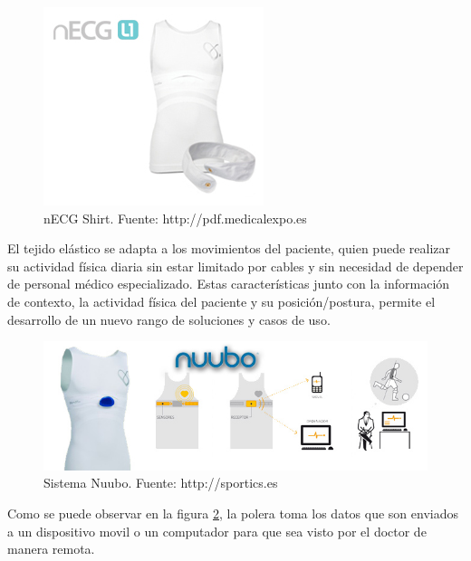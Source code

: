 \begin{figure}[H]
	\centering
	\includegraphics[scale=0.6]{figuras/estadoarte/nuubo/shirt.png}
	\caption{nECG Shirt. Fuente: http://pdf.medicalexpo.es}
	\label{shirt}
\end{figure}

El tejido elástico se adapta a los movimientos del paciente, quien puede realizar su actividad física diaria sin estar limitado por cables y sin necesidad de depender de personal médico especializado. Estas características junto con la información de contexto, la actividad física del paciente y su posición/postura, permite el desarrollo de un nuevo rango de soluciones y casos de uso. 

\begin{figure}[H]
	\centering
	\includegraphics[scale=0.7]{figuras/estadoarte/nuubo/nuubo.png}
	\caption{Sistema Nuubo. Fuente: http://sportics.es}
	\label{nuubo}
\end{figure}

Como se puede observar en la figura \ref{nuubo}, la polera toma los datos que son enviados a un dispositivo movil o un computador para que sea visto por el doctor de manera remota.